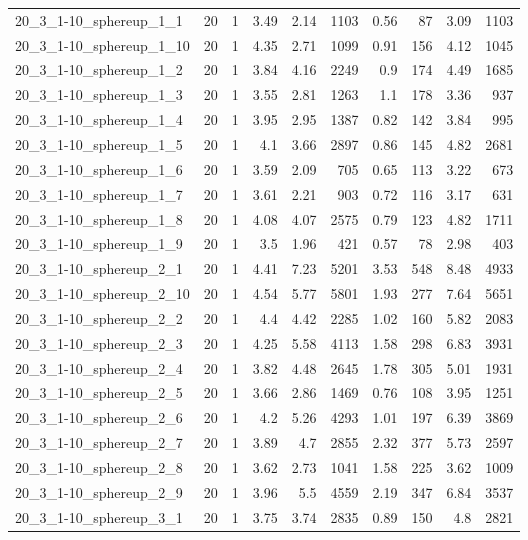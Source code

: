 \begin{center}
\begin{scriptsize}
\begin{longtable}{lrrrrrrrrr}
20\_3\_1-10\_sphereup\_1\_1 & 20 & 1 & 3.49 & 2.14 & 1103 & 0.56 & 87 & 3.09 & 1103\\
20\_3\_1-10\_sphereup\_1\_10 & 20 & 1 & 4.35 & 2.71 & 1099 & 0.91 & 156 & 4.12 & 1045\\
20\_3\_1-10\_sphereup\_1\_2 & 20 & 1 & 3.84 & 4.16 & 2249 & 0.9 & 174 & 4.49 & 1685\\
20\_3\_1-10\_sphereup\_1\_3 & 20 & 1 & 3.55 & 2.81 & 1263 & 1.1 & 178 & 3.36 & 937\\
20\_3\_1-10\_sphereup\_1\_4 & 20 & 1 & 3.95 & 2.95 & 1387 & 0.82 & 142 & 3.84 & 995\\
20\_3\_1-10\_sphereup\_1\_5 & 20 & 1 & 4.1 & 3.66 & 2897 & 0.86 & 145 & 4.82 & 2681\\
20\_3\_1-10\_sphereup\_1\_6 & 20 & 1 & 3.59 & 2.09 & 705 & 0.65 & 113 & 3.22 & 673\\
20\_3\_1-10\_sphereup\_1\_7 & 20 & 1 & 3.61 & 2.21 & 903 & 0.72 & 116 & 3.17 & 631\\
20\_3\_1-10\_sphereup\_1\_8 & 20 & 1 & 4.08 & 4.07 & 2575 & 0.79 & 123 & 4.82 & 1711\\
20\_3\_1-10\_sphereup\_1\_9 & 20 & 1 & 3.5 & 1.96 & 421 & 0.57 & 78 & 2.98 & 403\\
20\_3\_1-10\_sphereup\_2\_1 & 20 & 1 & 4.41 & 7.23 & 5201 & 3.53 & 548 & 8.48 & 4933\\
20\_3\_1-10\_sphereup\_2\_10 & 20 & 1 & 4.54 & 5.77 & 5801 & 1.93 & 277 & 7.64 & 5651\\
20\_3\_1-10\_sphereup\_2\_2 & 20 & 1 & 4.4 & 4.42 & 2285 & 1.02 & 160 & 5.82 & 2083\\
20\_3\_1-10\_sphereup\_2\_3 & 20 & 1 & 4.25 & 5.58 & 4113 & 1.58 & 298 & 6.83 & 3931\\
20\_3\_1-10\_sphereup\_2\_4 & 20 & 1 & 3.82 & 4.48 & 2645 & 1.78 & 305 & 5.01 & 1931\\
20\_3\_1-10\_sphereup\_2\_5 & 20 & 1 & 3.66 & 2.86 & 1469 & 0.76 & 108 & 3.95 & 1251\\
20\_3\_1-10\_sphereup\_2\_6 & 20 & 1 & 4.2 & 5.26 & 4293 & 1.01 & 197 & 6.39 & 3869\\
20\_3\_1-10\_sphereup\_2\_7 & 20 & 1 & 3.89 & 4.7 & 2855 & 2.32 & 377 & 5.73 & 2597\\
20\_3\_1-10\_sphereup\_2\_8 & 20 & 1 & 3.62 & 2.73 & 1041 & 1.58 & 225 & 3.62 & 1009\\
20\_3\_1-10\_sphereup\_2\_9 & 20 & 1 & 3.96 & 5.5 & 4559 & 2.19 & 347 & 6.84 & 3537\\
20\_3\_1-10\_sphereup\_3\_1 & 20 & 1 & 3.75 & 3.74 & 2835 & 0.89 & 150 & 4.8 & 2821\\

\end{longtable}
\end{scriptsize}
\end{center}
